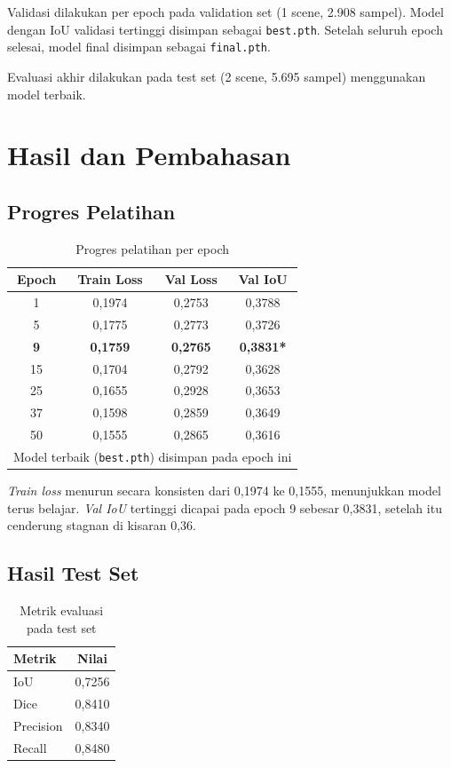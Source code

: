 \documentclass[12pt,a4paper]{article}
\begin{document}
Validasi dilakukan per epoch pada validation set (1 scene, 2.908 sampel). 
Model dengan IoU validasi tertinggi disimpan sebagai \texttt{best.pth}. 
Setelah seluruh epoch selesai, model final disimpan sebagai \texttt{final.pth}.

Evaluasi akhir dilakukan pada test set (2 scene, 5.695 sampel) menggunakan 
model terbaik.

\section{Hasil dan Pembahasan}
\label{sec:hasil}

\subsection{Progres Pelatihan}

\begin{table}[H]
\centering
\caption{Progres pelatihan per epoch}
\label{tab:training_progress}
\begin{tabular}{cccc}
\toprule
\textbf{Epoch} & \textbf{Train Loss} & \textbf{Val Loss} & \textbf{Val IoU} \\
\midrule
1 & 0,1974 & 0,2753 & 0,3788 \\
5 & 0,1775 & 0,2773 & 0,3726 \\
\textbf{9} & \textbf{0,1759} & \textbf{0,2765} & \textbf{0,3831*} \\
15 & 0,1704 & 0,2792 & 0,3628 \\
25 & 0,1655 & 0,2928 & 0,3653 \\
37 & 0,1598 & 0,2859 & 0,3649 \\
50 & 0,1555 & 0,2865 & 0,3616 \\
\bottomrule
\multicolumn{4}{l}{\small *Model terbaik (\texttt{best.pth}) disimpan pada epoch ini}
\end{tabular}
\end{table}

\textit{Train loss} menurun secara konsisten dari 0,1974 ke 0,1555, menunjukkan 
model terus belajar. \textit{Val IoU} tertinggi dicapai pada epoch 9 sebesar 
0,3831, setelah itu cenderung stagnan di kisaran 0,36.

\subsection{Hasil Test Set}

\begin{table}[H]
\centering
\caption{Metrik evaluasi pada test set}
\label{tab:test_metrics}
\begin{tabular}{lc}
\toprule
\textbf{Metrik} & \textbf{Nilai} \\
\midrule
IoU & 0,7256 \\
Dice & 0,8410 \\
Precision & 0,8340 \\
Recall & 0,8480 \\
\bottomrule
\end{tabular}
\end{table}
\end{document}
